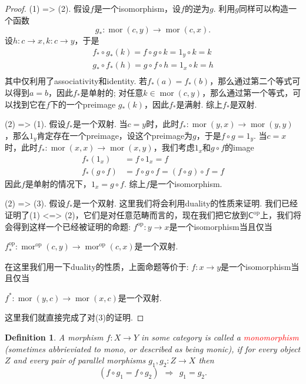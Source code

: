 \documentclass{article}
\newtheorem{definition}[theorem]{Definition}
\newcommand*{\cat}[1]{\textsf{#1}\xspace}
\newcommand{\id}{1}
\newcommand{\op}{\textrm{op}}
\newcommand*{\xfunc}[4]{{#2}\colon{#3}{#1}{#4}}
\newcommand*{\func}[3]{\xfunc{\to}{#1}{#2}{#3}}
\DeclareMathOperator{\mor}{mor}
\newcommand{\redt}[1]{\textcolor{red}{#1}}
\begin{document}
\begin{proof}
\rm  (1) => (2). 假设$f$是一个isomorphism，设$f$的逆为$g$. 利用$g$同样可以构造一个函数
$$
\func{g_*}{\mor(c,y)}{\mor(c,x)}.
$$
设$\func{h}{c}{x},\func{k}{c}{y}$，于是
$$
\begin{aligned}
f_*  \circ g_*(k) = f \circ g \circ k = \id_y \circ k  = k\\
g_*  \circ f_*(h) = g \circ f \circ h = \id_x \circ k  = h\\
\end{aligned}
$$
其中仅利用了associativity和identity. 若$f_*(a) = f_*(b)$，那么通过第二个等式可以得到$a = b$，因此$f_*$是单射的; 对任意$k \in \mor(c,y)$，那么通过第一个等式，可以找到它在$f$下的一个preimage $g_*(k)$，因此$f_*$是满射. 综上$f_*$是双射. 

\rm (2) => (1). 假设$f_*$是一个双射. 当$c = y$时，此时$\func{f_*}{\mor(y,x)}{\mor(y,y)}$，那么$\id_y$肯定存在一个preimage，设这个preimage为$g$，于是$f \circ g = \id_y$. 当$c = x$时，此时$\func{f_*}{\mor(x,x)}{\mor(x,y)}$，我们考虑$\id_x$和$g \circ f$的image
$$
\begin{aligned}
f_*(\id_x) &= f \circ \id_x = f  \\
f_*(g \circ f) &= f \circ g \circ f = (f \circ g) \circ f = f 
\end{aligned}
$$
因此$f$是单射的情况下，$\id_x = g \circ f$. 综上$f$是一个isomorphism. 

(2) => (3). 假设$f_*$是一个双射. 这里我们将会利用duality的性质来证明. 我们已经证明了(1) <=> (2)，它们是对任意范畴而言的，现在我们把它放到$\cat{C}^\op$上，我们将会得到这样一个已经被证明的命题: $\func{f^\op}{y}{x}$是一个isomorphism当且仅当
\begin{center}
$\func{f_*^\op}{\mor^\op(c,y)}{\mor^\op(c,x)}$是一个双射. 
\end{center}
在这里我们用一下duality的性质，上面命题等价于: $\func{f}{x}{y}$是一个isomorphism当且仅当
\begin{center}
$\func{f^*}{\mor(y,c)}{\mor(x,c)}$是一个双射.
\end{center}
这里我们就直接完成了对(3)的证明. 
\end{proof}


\begin{definition}
\rm A morphism $\func{f}{X}{Y}$ in some category is called a \redt{monomorphism} (sometimes abbrieviated to mono, or described as being monic), if for every object $Z$ and every pair of parallel morphisms $\func{g_1,g_2}{Z}{X}$ then
$$
(f \circ g_1 = f\circ g_2)~~\Rightarrow~~ g_1 = g_2. 
$$
\end{definition}
\end{document}
